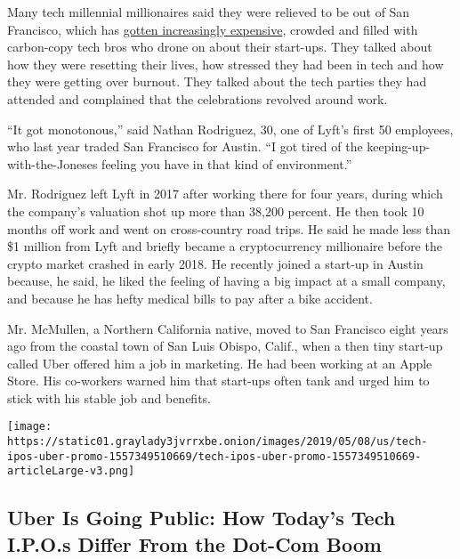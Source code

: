 Many tech millennial millionaires said they were relieved to be out of
San Francisco, which has
\href{https://www.nytimes3xbfgragh.onion/2019/03/07/style/uber-ipo-san-francisco-rich.html}{gotten
increasingly expensive}, crowded and filled with carbon-copy tech bros
who drone on about their start-ups. They talked about how they were
resetting their lives, how stressed they had been in tech and how they
were getting over burnout. They talked about the tech parties they had
attended and complained that the celebrations revolved around work.

``It got monotonous,'' said Nathan Rodriguez, 30, one of Lyft's first 50
employees, who last year traded San Francisco for Austin. ``I got tired
of the keeping-up-with-the-Joneses feeling you have in that kind of
environment.''

Mr. Rodriguez left Lyft in 2017 after working there for four years,
during which the company's valuation shot up more than 38,200 percent.
He then took 10 months off work and went on cross-country road trips. He
said he made less than \$1 million from Lyft and briefly became a
cryptocurrency millionaire before the crypto market crashed in early
2018. He recently joined a start-up in Austin because, he said, he liked
the feeling of having a big impact at a small company, and because he
has hefty medical bills to pay after a bike accident.

Mr. McMullen, a Northern California native, moved to San Francisco eight
years ago from the coastal town of San Luis Obispo, Calif., when a then
tiny start-up called Uber offered him a job in marketing. He had been
working at an Apple Store. His co-workers warned him that start-ups
often tank and urged him to stick with his stable job and benefits.

\href{https://www.nytimes3xbfgragh.onion/interactive/2019/05/09/business/dealbook/tech-ipos-uber.html}{}

\texttt{[image: https://static01.graylady3jvrrxbe.onion/images/2019/05/08/us/tech-ipos-uber-promo-1557349510669/tech-ipos-uber-promo-1557349510669-articleLarge-v3.png]}

\hypertarget{uber-is-going-public-how-todays-tech-ipos-differ-from-the-dot-com-boom}{%
\subsection{Uber Is Going Public: How Today's Tech I.P.O.s Differ From
the Dot-Com
Boom}\label{uber-is-going-public-how-todays-tech-ipos-differ-from-the-dot-com-boom}}

